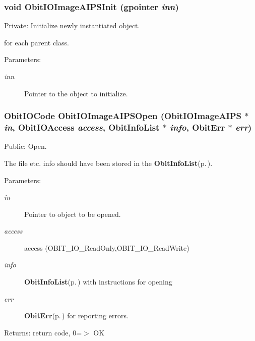 \subsubsection{\setlength{\rightskip}{0pt plus 5cm}void Obit\-IOImage\-AIPSInit (gpointer {\em inn})}\label{ObitIOImageAIPS_8c_a3}


Private: Initialize newly instantiated object. 

for each parent class. \begin{Desc}
\item[Parameters:]
\begin{description}
\item[{\em inn}]Pointer to the object to initialize. \end{description}
\end{Desc}
\subsubsection{\setlength{\rightskip}{0pt plus 5cm}Obit\-IOCode Obit\-IOImage\-AIPSOpen ({\bf Obit\-IOImage\-AIPS} $\ast$ {\em in}, Obit\-IOAccess {\em access}, {\bf Obit\-Info\-List} $\ast$ {\em info}, {\bf Obit\-Err} $\ast$ {\em err})}\label{ObitIOImageAIPS_8c_a12}


Public: Open. 

The file etc. info should have been stored in the {\bf Obit\-Info\-List}{\rm (p.\,\pageref{structObitInfoList})}. \begin{Desc}
\item[Parameters:]
\begin{description}
\item[{\em in}]Pointer to object to be opened. \item[{\em access}]access (OBIT\_\-IO\_\-Read\-Only,OBIT\_\-IO\_\-Read\-Write) \item[{\em info}]{\bf Obit\-Info\-List}{\rm (p.\,\pageref{structObitInfoList})} with instructions for opening \item[{\em err}]{\bf Obit\-Err}{\rm (p.\,\pageref{structObitErr})} for reporting errors. \end{description}
\end{Desc}
\begin{Desc}
\item[Returns:]return code, 0=$>$ OK \end{Desc}
